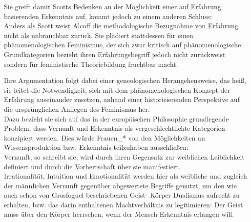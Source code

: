 Sie greift damit Scotts Bedenken an der Möglichkeit einer auf Erfahrung
basierenden Erkenntnis auf, kommt jedoch zu einem anderen Schluss:\\
Anders als
Scott weist Alcoff die methodologische Bezugnahme von Erfahrung nicht als
unbrauchbar zurück. Sie plädiert stattdessen für einen phänomenologischen
Feminismus, der sich zwar kritisch auf phänomenologische Grundkategorien
bezieht ihren Erfahrungsbegriff jedoch nicht zurückweist sondern für
feministische Theoriebildung fruchtbar macht.

Ihre Argumentation folgt dabei
einer geneologischen Herangehensweise, das heiß, sie leitet die Notwendigkeit,
sich mit dem phänomenologischen Konzept der Erfahrung auseinander zusetzen,
anhand einer historisierenden Perspektive auf die ursprünglichen Anliegen des
Feminismus her. \\
Dazu bezieht sie sich auf das in der europäischen Philosophie
grundlegende Problem, dass Vernunft und Erkenntnis als vergeschlechtlichte
Kategorien konzipiert werden. Dies würde Frauen\_* von den Möglichkeiten an
Wissensproduktion bzw. Erkenntnis teilzuhaben ausschließen: \\
Vernunft, so
schreibt sie, wird durch ihren Gegensatz zur weiblichen Leiblichkeit definiert
und durch die Vorherrschaft über sie manifestiert. \footnotemark
{} \\
Irrationalität, Intuition und
Emotionalität werden hier als weibliche und zugleich der männlichen Vernunft
gegenüber abgewertete Begriffe genutzt, um den wie auch schon von Grosfoguel
beschriebenen Geist- Körper Dualismus aufrecht zu erhalten, bzw. das darin
enthaltenen Machtverhältnis zu legitimieren: Der Geist muss über den Körper
herrschen, \glqq wenn der Mensch Erkenntnis erlangen will.\grqq \footnotemark
{}

